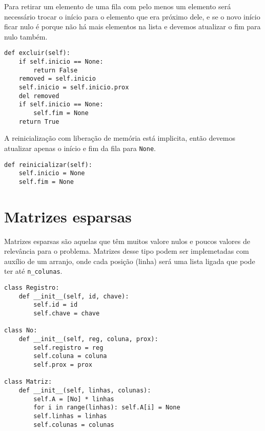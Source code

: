 \documentclass[a4paper, twocolumn]{article}
\theoremstyle{definition}
\begin{document}
Para retirar um elemento de uma fila com pelo menos um elemento será necessário trocar o início para o elemento que era próximo dele, e se o novo início ficar nulo é porque não há mais elementos na lista e devemos atualizar o fim para nulo também.
\begin{lstlisting}[label=fila_din_excluir, caption= Fila dinâmica (remoção)]
def excluir(self):
    if self.inicio == None:
        return False
    removed = self.inicio
    self.inicio = self.inicio.prox
    del removed
    if self.inicio == None:
        self.fim = None
    return True
\end{lstlisting}

A reinicialização com liberação de memória está implicita, então devemos atualizar apenas o início e fim da fila para \texttt{None}.
\begin{lstlisting}[label=fila_din_reiniciar, caption= Fila dinâmica (reinicialização)]
def reinicializar(self):
    self.inicio = None
    self.fim = None
\end{lstlisting}

\section{Matrizes esparsas}

Matrizes esparsas são aquelas que têm muitos valore nulos e poucos valores de relevância para o problema. Matrizes desse tipo podem ser implemetadas com auxílio de um arranjo, onde cada posição (linha) será uma lista ligada que pode ter até \texttt{n\_colunas}.
\begin{lstlisting}[label=matriz_estrutura, caption= Matriz Esparsa (estrutura)]
class Registro:
    def __init__(self, id, chave):
        self.id = id
        self.chave = chave

class No:
    def __init__(self, reg, coluna, prox):
        self.registro = reg
        self.coluna = coluna
        self.prox = prox 

class Matriz:
    def __init__(self, linhas, colunas):
        self.A = [No] * linhas
        for i in range(linhas): self.A[i] = None
        self.linhas = linhas
        self.colunas = colunas
\end{lstlisting}
\end{document}
